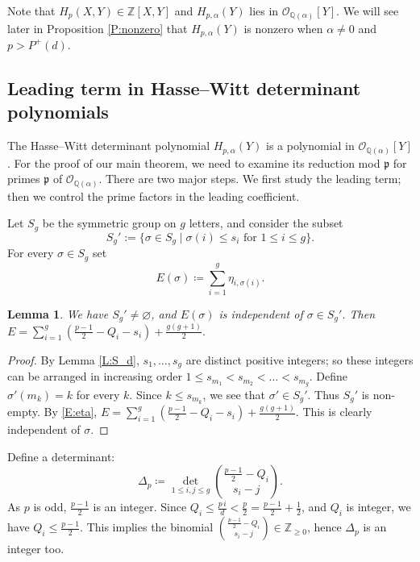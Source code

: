 \documentclass{amsart}
\theoremstyle{plain}
\newtheorem{lemma}[theorem]{Lemma}
\theoremstyle{remark}
\theoremstyle{remark}
\newcommand{\fp}{\mathfrak{p}}
\newcommand{\cO}{\mathcal{O}}
\newcommand{\0}{\mathbf{0}}
\newcommand{\1}{\mathbf{1}}
\newcommand{\Q}{\mathbb{Q}}
\newcommand{\Z}{\mathbb{Z}}
\begin{document}
Note that $H_p(X,Y)\in\Z[X,Y]$ and $H_{p,\alpha}(Y)$ lies in 
$\cO_{\Q(\alpha)}[Y]$. 
We will see later in Proposition \ref{P:nonzero}
that $H_{p,\alpha}(Y)$ is nonzero when $\alpha\ne 0$ and $p>P^+(d)$. 


\subsection{Leading term in Hasse--Witt determinant polynomials}

The Hasse--Witt determinant 
polynomial $H_{p,\alpha}(Y)$ is a polynomial in 
$\cO_{\Q(\alpha)}[Y]$. For the proof of our main theorem, 
we need to examine its reduction mod $\fp$ for primes 
$\fp$ of  $\cO_{\Q(\alpha)}$.
There are two major steps.
We first study the leading term;
then we control the prime factors in the leading coefficient.

Let $S_g$ be the symmetric group on $g$ letters, and consider the subset 
$$
S_g':=\{\sigma\in S_g\mid \sigma(i)\le s_i \mbox{ for $1\le i\le g$}\}.
$$
For every $\sigma\in S_g$ set 
$$E(\sigma)\coloneqq\sum_{i=1}^g \eta_{i,\sigma(i)}.$$

\begin{lemma}\label{L:E}
We have $S_g'\ne \varnothing$, and $E(\sigma)$ is independent of 
$\sigma\in S_g'$. Then 
$
E=\sum_{i=1}^g \left(\frac{p-1}{2}-Q_i-s_i\right)+\frac{g(g+1)}{2}.
$
\end{lemma}
\begin{proof}
By Lemma \ref{L:S_d}, $s_1,\ldots,s_g$ are distinct positive integers;
so these integers can be arranged in increasing order $1\le s_{m_1}<s_{m_2}<\ldots<s_{m_g}$. 
Define $\sigma'(m_k)=k$ for every $k$. Since $k\le s_{m_k}$, we see that 
$\sigma'\in S_g'$. Thus
$S_g'$ is non-empty. 
By \eqref{E:eta},
$E=\sum_{i=1}^g\left(\frac{p-1}{2}-Q_i-s_i\right)+\frac{g(g+1)}2.$
This is clearly independent of $\sigma$.
\end{proof}

Define a determinant:
\begin{equation}\label{E:Delta_p}
\boxed{\Delta_p \coloneqq \det_{1\le i,j\le g}
    \binom{\frac{p-1}{2}-Q_i}{s_i-j}.}
    \end{equation}
As $p$ is odd, $\frac{p-1}{2}$ is an integer.
Since $Q_i\le \frac{p\,i}{d}<\frac{p}{2}=\frac{p-1}{2}+\frac{1}{2}$,
and $Q_i$ is integer, we have 
$Q_i\le \frac{p-1}{2}$. This implies
the binomial $\binom{\frac{p-1}{2}-Q_i}{s_i-j}\in\Z_{\ge 0}$,
hence $\Delta_p$ is an integer too. 
\end{document}
